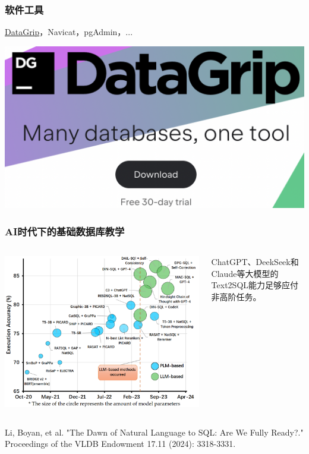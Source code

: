 \documentclass[aspectratio=169, 14pt]{beamer}
\begin{document}
\begin{frame}
	\frametitle{软件工具}
	\href{https://www.jetbrains.com/datagrip/}{DataGrip}，Navicat，pgAdmin，...

	\begin{center}
		\includegraphics[width=.55\paperwidth]{image/datagrip}
	\end{center}

\end{frame}
\begin{frame}
	\frametitle{AI时代下的基础数据库教学}

	\begin{columns}
		\begin{center}
			\includegraphics[width=.5\paperwidth]{image/text2sql}
		\end{center}
		ChatGPT、DeekSeek和Claude等大模型的Text2SQL能力足够应付非高阶任务。
	\end{columns}


	{\tiny Li, Boyan, et al. "The Dawn of Natural Language to SQL: Are We Fully Ready?." Proceedings of the VLDB Endowment 17.11 (2024): 3318-3331.}
\end{frame}
\end{document}
